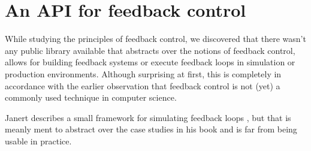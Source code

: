 \chapter{An API for feedback control}

While studying the principles of feedback control, we discovered that there wasn't any public library available that abstracts over the notions of feedback control, allows for building feedback systems or execute feedback loops in simulation or production environments. Although surprising at first, this is completely in accordance with the earlier observation that feedback control is not (yet) a commonly used technique in computer science.

Janert describes a small framework for simulating feedback loops \cite{janert2013-feedback}, but that is meanly ment to abstract over the case studies in his book and is far from being usable in practice.


